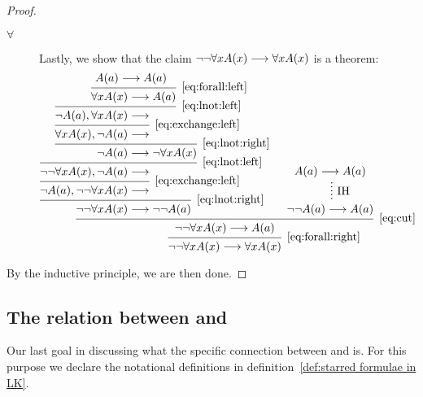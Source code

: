 \documentclass[11pt,a4paper]{article}
\begin{document}
\begin{example}[3.11]
\begin{proof}
\begin{enumerate}
\begin{description}
                    \item[\(\forall\)]
                        Lastly, we show that the claim \(\lnot\lnot\forall xA(x) \longrightarrow \forall xA(x)\) is a theorem:
                        \footnotesize
                        \begin{equation*}
                            \begin{prooftree}
                                \hypo{A(a)\seq A(a)}
                                \infer1[\eqref{eq:forall:left}]{\forall xA(x)&\seq A(a)}
                                \infer1[\eqref{eq:lnot:left}]{\lnot A(a),\forall xA(x)&\seq}
                                \infer1[\eqref{eq:exchange:left}]{\forall xA(x),\lnot A(a)&\seq}
                                \infer1[\eqref{eq:lnot:right}]{\lnot A(a)&\seq\lnot\forall xA(x)}
                                \infer1[\eqref{eq:lnot:left}]{\lnot\lnot\forall xA(x), \lnot A(a)&\seq}
                                \infer1[\eqref{eq:exchange:left}]{\lnot A(a), \lnot\lnot\forall xA(x)&\seq}
                                \infer1[\eqref{eq:lnot:right}]{\lnot\lnot\forall xA(x)&\seq \lnot\lnot A(a)}
                                \hypo{A(a)\seq A(a)}
                                \ellipsis{\IH}{\lnot\lnot A(a)\seq A(a)}
                                \infer2[\eqref{eq:cut}]{\lnot\lnot\forall xA(x) \seq A(a)}
                                \infer1[\eqref{eq:forall:right}]{\lnot\lnot\forall xA(x) \seq \forall xA(x)}
                            \end{prooftree}
                        \end{equation*}
                        \normalsize
                \end{description}
        \end{enumerate}
        By the inductive principle, we are then done.
    \end{proof}
\end{example}

\subsection{\texorpdfstring{The relation between \LK{} and \LJ}{The relation between LK and LJ}}

Our last goal in discussing what the specific connection between \LK{} and \LJ{} is.
For this purpose we declare the notational definitions in definition~\ref{def:starred formulae in LK}.
\end{document}
